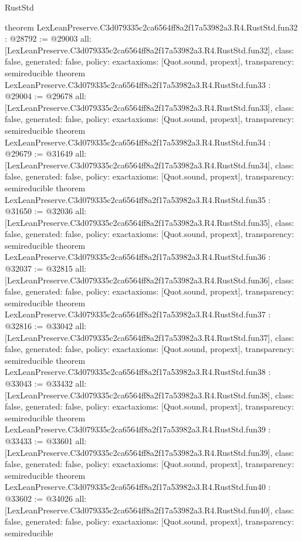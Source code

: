 \begin{lexlean}{RustStd}
\begin{coremodule}
{}
theorem LexLeanPreserve.C3d079335c2ca6564ff8a2f17a53982a3.R4.RustStd.fun32 : @28792 := @29003 {
  all: [LexLeanPreserve.C3d079335c2ca6564ff8a2f17a53982a3.R4.RustStd.fun32],
  class: false,
  generated: false,
  policy: exact{axioms: [Quot.sound, propext]},
  transparency: semireducible
}
theorem LexLeanPreserve.C3d079335c2ca6564ff8a2f17a53982a3.R4.RustStd.fun33 : @29004 := @29678 {
  all: [LexLeanPreserve.C3d079335c2ca6564ff8a2f17a53982a3.R4.RustStd.fun33],
  class: false,
  generated: false,
  policy: exact{axioms: [Quot.sound, propext]},
  transparency: semireducible
}
theorem LexLeanPreserve.C3d079335c2ca6564ff8a2f17a53982a3.R4.RustStd.fun34 : @29679 := @31649 {
  all: [LexLeanPreserve.C3d079335c2ca6564ff8a2f17a53982a3.R4.RustStd.fun34],
  class: false,
  generated: false,
  policy: exact{axioms: [Quot.sound, propext]},
  transparency: semireducible
}
theorem LexLeanPreserve.C3d079335c2ca6564ff8a2f17a53982a3.R4.RustStd.fun35 : @31650 := @32036 {
  all: [LexLeanPreserve.C3d079335c2ca6564ff8a2f17a53982a3.R4.RustStd.fun35],
  class: false,
  generated: false,
  policy: exact{axioms: [Quot.sound, propext]},
  transparency: semireducible
}
theorem LexLeanPreserve.C3d079335c2ca6564ff8a2f17a53982a3.R4.RustStd.fun36 : @32037 := @32815 {
  all: [LexLeanPreserve.C3d079335c2ca6564ff8a2f17a53982a3.R4.RustStd.fun36],
  class: false,
  generated: false,
  policy: exact{axioms: [Quot.sound, propext]},
  transparency: semireducible
}
theorem LexLeanPreserve.C3d079335c2ca6564ff8a2f17a53982a3.R4.RustStd.fun37 : @32816 := @33042 {
  all: [LexLeanPreserve.C3d079335c2ca6564ff8a2f17a53982a3.R4.RustStd.fun37],
  class: false,
  generated: false,
  policy: exact{axioms: [Quot.sound, propext]},
  transparency: semireducible
}
theorem LexLeanPreserve.C3d079335c2ca6564ff8a2f17a53982a3.R4.RustStd.fun38 : @33043 := @33432 {
  all: [LexLeanPreserve.C3d079335c2ca6564ff8a2f17a53982a3.R4.RustStd.fun38],
  class: false,
  generated: false,
  policy: exact{axioms: [Quot.sound, propext]},
  transparency: semireducible
}
theorem LexLeanPreserve.C3d079335c2ca6564ff8a2f17a53982a3.R4.RustStd.fun39 : @33433 := @33601 {
  all: [LexLeanPreserve.C3d079335c2ca6564ff8a2f17a53982a3.R4.RustStd.fun39],
  class: false,
  generated: false,
  policy: exact{axioms: [Quot.sound, propext]},
  transparency: semireducible
}
theorem LexLeanPreserve.C3d079335c2ca6564ff8a2f17a53982a3.R4.RustStd.fun40 : @33602 := @34026 {
  all: [LexLeanPreserve.C3d079335c2ca6564ff8a2f17a53982a3.R4.RustStd.fun40],
  class: false,
  generated: false,
  policy: exact{axioms: [Quot.sound, propext]},
  transparency: semireducible
}
\end{coremodule}
\end{lexlean}

